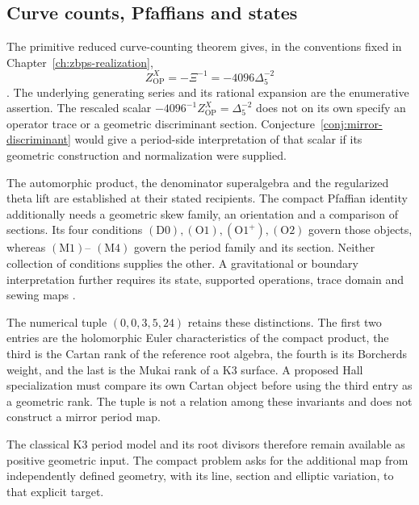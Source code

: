 \subsection{Curve counts, Pfaffians and states}
\label{subsec:view4-not-asserted}

The primitive reduced curve-counting theorem gives, in the
conventions fixed in Chapter~\ref{ch:zbps-realization},
\[
 Z^X_{\mathrm{OP}}=-\Xi^{-1}=-4096\Delta_5^{-2}
\]
\cite{BRYAN,OB}. The underlying generating series and its rational
expansion are the enumerative assertion. The rescaled scalar
\(-4096^{-1}Z^X_{\mathrm{OP}}=\Delta_5^{-2}\) does not on its own
specify an operator trace or a geometric discriminant section.
Conjecture~\ref{conj:mirror-discriminant} would give a period-side
interpretation of that scalar if its geometric construction and
normalization were supplied.

The automorphic product, the denominator superalgebra and the
regularized theta lift are established at their stated recipients.
The compact Pfaffian identity additionally needs a geometric skew
family, an orientation and a comparison of sections. Its four
conditions \((\mathrm{D0}), (\mathrm{O1}), (\mathrm{O1}^{+}),
(\mathrm{O2})\) govern those objects, whereas \((\mathrm M1)\)--
\((\mathrm M4)\) govern the period family and its section.
Neither collection of conditions supplies the other.
A gravitational or boundary interpretation further requires its
state, supported operations, trace domain and sewing maps
\cite{ChiralBarCobarVolII,MixedHTSCompanion,CYQGVolIII}.

The numerical tuple \((0,0,3,5,24)\) retains these distinctions.
The first two entries are the holomorphic Euler characteristics of
the compact product, the third is the Cartan rank of the reference
root algebra, the fourth is its Borcherds weight, and the last is
the Mukai rank of a K3 surface. A proposed Hall specialization must
compare its own Cartan object before using the third entry as a
geometric rank. The tuple is not a relation among these invariants
and does not construct a mirror period map.

The classical K3 period model and its root divisors therefore remain
available as positive geometric input. The compact problem asks for
the additional map from independently defined geometry, with its
line, section and elliptic variation, to that explicit target.
